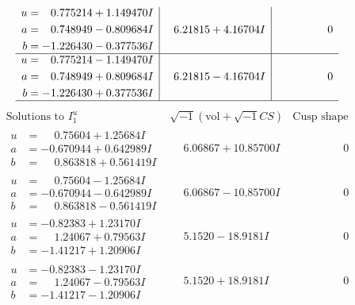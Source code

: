 \documentclass[1p]{elsarticle_modified}
\theoremstyle{definition}
\newcommand{\I}{\sqrt{-1}}
\begin{document}
$$\begin{array}{c|c|c}
\begin{aligned}
u &= \phantom{-}0.775214 + 1.149470 I \\
a &= \phantom{-}0.748949 - 0.809684 I \\
b &= -1.226430 - 0.377536 I\end{aligned}
 & \phantom{-}6.21815 + 4.16704 I & \phantom{-0.000000 } 0 \\ \hline\begin{aligned}
u &= \phantom{-}0.775214 - 1.149470 I \\
a &= \phantom{-}0.748949 + 0.809684 I \\
b &= -1.226430 + 0.377536 I\end{aligned}
 & \phantom{-}6.21815 - 4.16704 I & \phantom{-0.000000 } 0\\
 \hline 
 \end{array}$$\newpage$$\begin{array}{c|c|c}  
\text{Solutions to }I^u_{1}& \I (\text{vol} + \sqrt{-1}CS) & \text{Cusp shape}\\
 \hline 
\begin{aligned}
u &= \phantom{-}0.75604 + 1.25684 I \\
a &= -0.670944 + 0.642989 I \\
b &= \phantom{-}0.863818 + 0.561419 I\end{aligned}
 & \phantom{-}6.06867 + 10.85700 I & \phantom{-0.000000 } 0 \\ \hline\begin{aligned}
u &= \phantom{-}0.75604 - 1.25684 I \\
a &= -0.670944 - 0.642989 I \\
b &= \phantom{-}0.863818 - 0.561419 I\end{aligned}
 & \phantom{-}6.06867 - 10.85700 I & \phantom{-0.000000 } 0 \\ \hline\begin{aligned}
u &= -0.82383 + 1.23170 I \\
a &= \phantom{-}1.24067 + 0.79563 I \\
b &= -1.41217 + 1.20906 I\end{aligned}
 & \phantom{-}5.1520 - 18.9181 I & \phantom{-0.000000 } 0 \\ \hline\begin{aligned}
u &= -0.82383 - 1.23170 I \\
a &= \phantom{-}1.24067 - 0.79563 I \\
b &= -1.41217 - 1.20906 I\end{aligned}
 & \phantom{-}5.1520 + 18.9181 I & \phantom{-0.000000 } 0 \\ \hline\begin{aligned}

\end{aligned}
\end{array}$$
\end{document}
